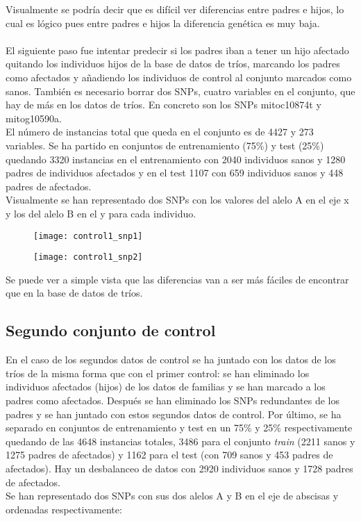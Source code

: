 Visualmente se podría decir que es difícil ver diferencias entre padres e hijos, lo cual es lógico pues entre padres e hijos la diferencia genética es muy baja.\\\\

El siguiente paso fue intentar predecir si los padres iban a tener un hijo afectado quitando los individuos hijos de la base de datos de tríos, marcando los padres como afectados y añadiendo los individuos de control al conjunto marcados como sanos. También es necesario borrar dos SNPs, cuatro variables en el conjunto, que hay de más en los datos de tríos. En concreto son los SNPs mitoc10874t y mitog10590a.\\
El número de instancias total que queda en el conjunto es de 4427 y 273 variables. Se ha partido en conjuntos de entrenamiento (75\%) y test (25\%) quedando 3320 instancias en el entrenamiento con 2040 individuos sanos y 1280 padres de individuos afectados y en el test 1107 con 659 individuos sanos y 448 padres de afectados.\\
Visualmente se han representado dos SNPs con los valores del alelo A en el eje x y los del alelo B en el y para cada individuo.

\begin{figure}[H]
\centering
\begin{minipage}{.5\textwidth}
  \centering
  \texttt{[image: control1\_snp1]}
  \label{fig:snp1-control1}
\end{minipage}%
\begin{minipage}{.5\textwidth}
  \centering
  \texttt{[image: control1\_snp2]}
  \label{fig:snp2-control1}
\end{minipage}
\end{figure}

Se puede ver a simple vista que las diferencias van a ser más fáciles de encontrar que en la base de datos de tríos.

\subsection{Segundo conjunto de control}
En el caso de los segundos datos de control se ha juntado con los datos de los tríos de la misma forma que con el primer control: se han eliminado los individuos afectados (hijos) de los datos de familias y se han marcado a los padres como afectados. Después se han eliminado los SNPs redundantes de los padres y se han juntado con estos segundos datos de control. Por último, se ha separado en conjuntos de entrenamiento y test en un 75\% y 25\% respectivamente quedando de las 4648 instancias totales, 3486 para el conjunto \textit{train} (2211 sanos y 1275 padres de afectados) y 1162 para el test (con 709 sanos y 453 padres de afectados). Hay un desbalanceo de datos con 2920 individuos sanos y 1728 padres de afectados.\\
Se han representado dos SNPs con sus dos alelos A y B en el eje de abscisas y ordenadas respectivamente:

